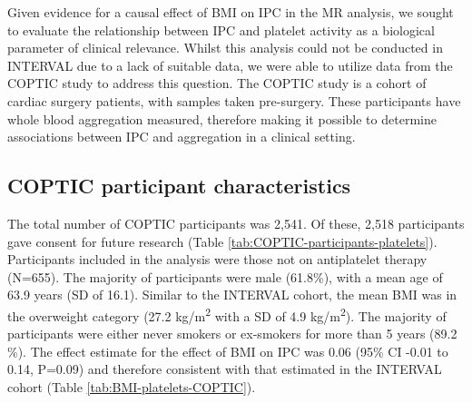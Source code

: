 \documentclass[11pt,twoside]{bristolthesis}
\begin{document}
Given evidence for a causal effect of BMI on IPC in the MR analysis, we sought to evaluate the relationship between IPC and platelet activity as a biological parameter of clinical relevance. Whilst this analysis could not be conducted in INTERVAL due to a lack of suitable data, we were able to utilize data from the COPTIC study to address this question. The COPTIC study is a cohort of cardiac surgery patients, with samples taken pre-surgery. These participants have whole blood aggregation measured, therefore making it possible to determine associations between IPC and aggregation in a clinical setting.

\hypertarget{coptic-participant-characteristics}{%
\subsection{COPTIC participant characteristics}\label{coptic-participant-characteristics}}

The total number of COPTIC participants was 2,541. Of these, 2,518 participants gave consent for future research (Table \ref{tab:COPTIC-participants-platelets}). Participants included in the analysis were those not on antiplatelet therapy (N=655). The majority of participants were male (61.8\%), with a mean age of 63.9 years (SD of 16.1). Similar to the INTERVAL cohort, the mean BMI was in the overweight category (27.2 kg/m\textsuperscript{2} with a SD of 4.9 kg/m\textsuperscript{2}). The majority of participants were either never smokers or ex-smokers for more than 5 years (89.2 \%). The effect estimate for the effect of BMI on IPC was 0.06 (95\% CI -0.01 to 0.14, P=0.09) and therefore consistent with that estimated in the INTERVAL cohort (Table \ref{tab:BMI-platelets-COPTIC}).
\end{document}
